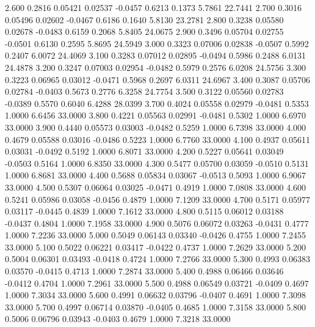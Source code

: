    2.600   0.2816   0.05421   0.02537  -0.0457   0.6213   0.1373   5.7861  22.7441
   2.700   0.3016   0.05496   0.02602  -0.0467   0.6186   0.1640   5.8130  23.2781
   2.800   0.3238   0.05580   0.02678  -0.0483   0.6159   0.2068   5.8405  24.0675
   2.900   0.3496   0.05704   0.02755  -0.0501   0.6130   0.2595   5.8695  24.5949
   3.000   0.3323   0.07006   0.02838  -0.0507   0.5992   0.2407   6.0072  24.4069
   3.100   0.3283   0.07012   0.02895  -0.0494   0.5986   0.2488   6.0131  24.4878
   3.200   0.3247   0.07003   0.02954  -0.0482   0.5979   0.2576   6.0208  24.5756
   3.300   0.3223   0.06965   0.03012  -0.0471   0.5968   0.2697   6.0311  24.6967
   3.400   0.3087   0.05706   0.02784  -0.0403   0.5673   0.2776   6.3258  24.7754
   3.500   0.3122   0.05560   0.02783  -0.0389   0.5570   0.6040   6.4288  28.0399
   3.700   0.4024   0.05558   0.02979  -0.0481   0.5353   1.0000   6.6456  33.0000
   3.800   0.4221   0.05563   0.02991  -0.0481   0.5302   1.0000   6.6970  33.0000
   3.900   0.4440   0.05573   0.03003  -0.0482   0.5259   1.0000   6.7398  33.0000
   4.000   0.4679   0.05588   0.03016  -0.0486   0.5223   1.0000   6.7760  33.0000
   4.100   0.4937   0.05611   0.03031  -0.0492   0.5192   1.0000   6.8071  33.0000
   4.200   0.5227   0.05641   0.03049  -0.0503   0.5164   1.0000   6.8350  33.0000
   4.300   0.5477   0.05700   0.03059  -0.0510   0.5131   1.0000   6.8681  33.0000
   4.400   0.5688   0.05834   0.03067  -0.0513   0.5093   1.0000   6.9067  33.0000
   4.500   0.5307   0.06064   0.03025  -0.0471   0.4919   1.0000   7.0808  33.0000
   4.600   0.5241   0.05986   0.03058  -0.0456   0.4879   1.0000   7.1209  33.0000
   4.700   0.5171   0.05977   0.03117  -0.0445   0.4839   1.0000   7.1612  33.0000
   4.800   0.5115   0.06012   0.03188  -0.0437   0.4804   1.0000   7.1958  33.0000
   4.900   0.5076   0.06072   0.03263  -0.0431   0.4777   1.0000   7.2236  33.0000
   5.000   0.5049   0.06143   0.03340  -0.0426   0.4755   1.0000   7.2455  33.0000
   5.100   0.5022   0.06221   0.03417  -0.0422   0.4737   1.0000   7.2629  33.0000
   5.200   0.5004   0.06301   0.03493  -0.0418   0.4724   1.0000   7.2766  33.0000
   5.300   0.4993   0.06383   0.03570  -0.0415   0.4713   1.0000   7.2874  33.0000
   5.400   0.4988   0.06466   0.03646  -0.0412   0.4704   1.0000   7.2961  33.0000
   5.500   0.4988   0.06549   0.03721  -0.0409   0.4697   1.0000   7.3034  33.0000
   5.600   0.4991   0.06632   0.03796  -0.0407   0.4691   1.0000   7.3098  33.0000
   5.700   0.4997   0.06714   0.03870  -0.0405   0.4685   1.0000   7.3158  33.0000
   5.800   0.5006   0.06796   0.03943  -0.0403   0.4679   1.0000   7.3218  33.0000
